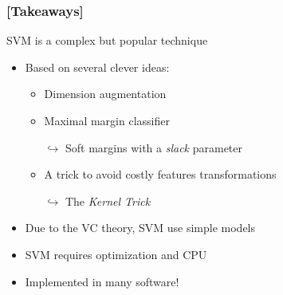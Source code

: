 \documentclass[xcolor=x11names,compress]{beamer}
\renewcommand{\(}{\begin{columns}}
\renewcommand{\)}{\end{columns}}
\newcommand{\<}[1]{\begin{column}{#1}}
\renewcommand{\>}{\end{column}}
\begin{document}
\begin{frame} %
\frametitle{\textcolor{brique}{[Takeaways]}}
SVM is a complex but popular technique
\begin{itemize}[<+->]
\item Based on several clever ideas:
\begin{itemize}[<+->]
    \item Dimension augmentation
    \item Maximal margin classifier
    \item[$\hookrightarrow$] Soft margins with a \textit{slack} parameter
    \item A trick to avoid costly features transformations
    \item[$\hookrightarrow$] The \textit{Kernel Trick}
    \end{itemize}
\item Due to the VC theory, SVM use simple models
\item SVM requires optimization and CPU
\item Implemented in many software!
\end{itemize}
\end{frame}
\end{document}
